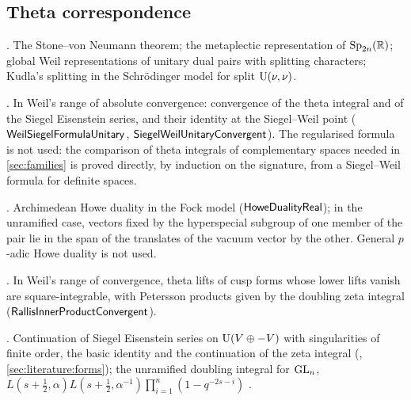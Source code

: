 \subsection{Theta correspondence}\label{sec:literature:theta}

\begin{description}[leftmargin=0pt,itemsep=1pt,parsep=0pt,font=\normalfont\itshape]
\item[Weil representation] \cite{Weil1964,MoeglinVignerasWaldspurger1987,Kudla1994}.  The
  Stone--von Neumann theorem; the metaplectic representation of $\operatorname{Sp}_{2n}(\mathbb{R})$; global Weil
  representations of unitary dual pairs with splitting characters; Kudla's splitting in the
  Schr\"odinger model for split $\operatorname{U}(\nu,\nu)$.  
\item[Siegel--Weil formula] \cite{Weil1965,KudlaRallis1988,Ichino2004}.  In Weil's range of
  absolute convergence: convergence of the theta integral and of the Siegel Eisenstein series, and
  their identity at the Siegel--Weil point ($\mathsf{WeilSiegelFormulaUnitary}$,
  $\mathsf{SiegelWeilUnitaryConvergent}$).    The regularised formula
  \cite{KudlaRallis1994} is not used: the comparison of theta integrals of complementary spaces needed
  in \cref{sec:families} is proved directly, by induction on the signature, from a Siegel--Weil
  formula for definite spaces.
\item[Howe duality] \cite{Howe1979,Howe1989}.  Archimedean Howe duality in the Fock model
  ($\mathsf{HoweDualityReal}$); in the unramified case, vectors fixed by the hyperspecial subgroup
  of one member of the pair lie in the span of the translates of the vacuum vector by the other.
  General $p$-adic Howe duality \cite{GanTakeda2016} is not used.  
\item[Rallis inner product formula] \cite{Rallis1984inj,GanQiuTakeda2014}.  In Weil's range of
  convergence, theta lifts of cusp forms whose lower lifts vanish are square-integrable, with Petersson
  products given by the doubling zeta integral ($\mathsf{RallisInnerProductConvergent}$).
\item[Doubling method] \cite{GelbartPiatetskiShapiroRallis1987,PiatetskiShapiroRallis1987,Langlands1976}.
  Continuation of Siegel Eisenstein series on $\operatorname{U}(V\oplus-V)$ with singularities of finite order,
  the basic identity and the continuation of the zeta integral (,
  \cref{sec:literature:forms}); the unramified doubling integral for $\operatorname{GL}_n$,
  $L(s+\frac12,\alpha)L(s+\frac12,\alpha^{-1})\prod_{i=1}^n(1-q^{-2s-i})$ .
\end{description}

